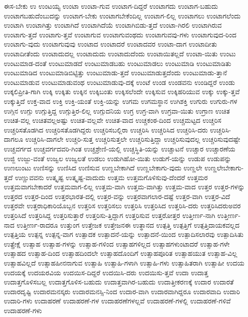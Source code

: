 {ಈಸ-ಬೇಕು
ಉ
ಉಂಟಯ್ಯ
ಉಂಟಾ
ಉಂಟಾ-ಗುವ
ಉಂಟಾಗ-ದಿದ್ದರೆ
ಉಂಟಾಗದು
ಉಂಟಾಗ-ಬಹುದು
ಉಂಟಾಗಬಹುದೆಂಬುದನ್ನು
ಉಂಟಾಗ-ಬೇಕು
ಉಂಟಾಗಬೇಕೆಂದಿಲ್ಲ
ಉಂಟಾಗ-ಲಿಲ್ಲ
ಉಂಟಾಗಲು
ಉಂಟಾಗಲೆಂದು
ಉಂಟಾಗಿ
ಉಂಟಾಗಿತ್ತು
ಉಂಟಾಗಿದೆ
ಉಂಟಾಗಿದೆಯೆ
ಉಂಟಾಗಿಬಿಡು-ತ್ತದೆ
ಉಂಟಾ-ಗಿರಲಿ
ಉಂಟಾಗಿರುವ
ಉಂಟಾಗು-ತ್ತದೆ
ಉಂಟಾಗು-ತ್ತವೆ
ಉಂಟಾಗುವ
ಉಂಟಾಗುವಂಥದು
ಉಂಟಾಗುವವು-ಗಳು
ಉಂಟಾಗುವುದ-ರಿಂದ
ಉಂಟಾಗು-ವುದು
ಉಂಟಾಗುವುವು
ಉಂಟಾದ
ಉಂಟಾದರೆ
ಉಂಟಾದವರ
ಉಂಟಾ-ದಾಗ
ಉಂಟಾದೀತು
ಉಂಟಾದೀತೆಂದು
ಉಂಟಾದುದಲ್ಲ
ಉಂಟಾದುದು
ಉಂಟಾದುದೆಂದು
ಉಂಟಾಯಿತಲ್ಲದೆ
ಉಂಟಾ-ಯಿತು
ಉಂಟು
ಉಂಟುಮಾಡ-ದಂತೆ
ಉಂಟುಮಾಡದೆ
ಉಂಟುಮಾಡಬಹು
ಉಂಟುಮಾಡಲು
ಉಂಟುಮಾಡಿ
ಉಂಟುಮಾಡಿತು
ಉಂಟುಮಾಡಿದ
ಉಂಟುಮಾಡಿಬಿಟ್ಟಿತ್ತು
ಉಂಟುಮಾಡು-ತ್ತದೆ
ಉಂಟುಮಾಡುತ್ತದೆಂದು
ಉಂಟುಮಾಡು-ತ್ತಾನೆ
ಉಂಟುಮಾಡುವ
ಉಂಟುಮಾಡುವಂಥ
ಉಂಟುಮಾಡುವು-ದಕ್ಕೆ
ಉಂಟೆ
ಉಂಡ
ಉಂಡವನು
ಉಂಡಿದ್ದರೆ
ಉಂಡು
ಉಕ್ಕಲಿಪ್ರೀತಿ-ಗಾಗಿ
ಉಕ್ಕಿ
ಉಕ್ಕಿತು
ಉಕ್ಕಿನ
ಉಕ್ಕಿಬಂತು
ಉಕ್ಕಿಸಲೆಂದೇ
ಉಕ್ಕಿಸುವ
ಉಕ್ಕಿಹರಿಯುವ
ಉಕ್ಕು
ಉಕ್ಕು-ತ್ತವೆ
ಉಕ್ಕುತ್ತಿದೆ
ಉಕ್ತ-ವಾದ
ಉಕ್ತಿ
ಉಕ್ತಿ-ಯಂತೆ
ಉಕ್ತಿ-ಯನ್ನು
ಉಗಮ
ಉಗಮಸ್ಥಾನ
ಉಗಿಶಕ್ತಿ
ಉಗುರು
ಉಗುರು-ಗಳ
ಉಗ್ಗಿನ
ಉಗ್ಗು
ಉಗ್ಗುತ್ತಿದ್ದ
ಉಗ್ಗುತ್ತಿರ-ಲಿಲ್ಲ
ಉಗ್ಗುದನಿಯ
ಉಗ್ರ
ಉಗ್ರ-ವಾಗಿ
ಉಗ್ರವಾ-ಯಿತು
ಉಗ್ರಾಣ
ಉಚಿತ
ಉಚಿತ-ವಲ್ಲ
ಉಚಿತವಲ್ಲಅಷ್ಟು
ಉಚಿತ-ವಲ್ಲವೇ
ಉಚಿತ-ವಾದ
ಉಚ್ಚಕಂಠ-ದಿಂದ
ಉಚ್ಚಮಟ್ಟದ
ಉಚ್ಚರಿಸ
ಉಚ್ಚರಿಸತೊಡಗಿದ
ಉಚ್ಚರಿಸತೊಡಗಿದ್ದರು
ಉಚ್ಚರಿಸಬಲ್ಲಿರಾ
ಉಚ್ಚರಿಸಿ
ಉಚ್ಚರಿಸಿದ
ಉಚ್ಚರಿಸಿ-ದರು
ಉಚ್ಚರಿಸಿ-ದಾಗಲೂ
ಉಚ್ಚರಿಸಿ-ದಾಗಲೇ
ಉಚ್ಚರಿ-ಸುತ್ತ
ಉಚ್ಚರಿಸುತ್ತಲೇ
ಉಚ್ಚರಿಸುತ್ತಿದ್ದಾ
ಉಚ್ಚರಿಸುವುದಲ್ಲ
ಉಚ್ಚರಿಸುವುದಷ್ಟೇ
ಉಚ್ಚವರ್ಗದ
ಉಚ್ಚವರ್ಗದವರಿ-ಗಿಂತ
ಉಚ್ಚಶ್ರೇಣಿ-ಯಲ್ಲಿ
ಉಚ್ಚಸ್ಥಿತಿ-ಯನ್ನು
ಉಚ್ಚಾಟನೆ
ಉಚ್ಚಾರ
ಉಚ್ಚಾರಣೆಯ
ಉಜ್ಜಿ
ಉಜ್ಜು-ವಂತೆ
ಉಜ್ವಲ
ಉಜ್ವಲತೆ
ಉಡಲು
ಉಡುಗಿಹೋ-ಯಿತು
ಉಡುಗೆ-ಯನ್ನು
ಉಡುಪ
ಉಡುಪನ್ನು
ಉಣಲುಂಟು
ಉಣಿಸನ್ನು
ಉಣಿಸಿದ
ಉಣಿಸುವ
ಉಣ್ಣಬೇಕಾಗಿದೆ
ಉಣ್ಣಬೇಕಾಗು-ವುದು
ಉಣ್ಣಲೇ
ಉಣ್ಣಲೇಬೇಕಾಗು-ತ್ತದೆ
ಉಣ್ಣುವವನು
ಉತ್ಕೃಷ್ಟ
ಉತ್ಕೃಷ್ಟ-ವಾದುದು
ಉತ್ತಮ
ಉತ್ತಮಗೊಳಿಸುವು-ದೆಂದರೆ
ಉತ್ತಮರ
ಉತ್ತಮವಾಗಬೇಕಾದರೆ
ಉತ್ತಮವಾಗ-ಲಿಲ್ಲ
ಉತ್ತಮ-ವಾಗಿ
ಉತ್ತಮ-ವಾಗಿತ್ತು
ಉತ್ತಮ-ವಾದ
ಉತ್ತರ
ಉತ್ತರ-ಗಳನ್ನು
ಉತ್ತರದ
ಉತ್ತರ-ದಿಂದ
ಉತ್ತರಭಾರತ-ದಲ್ಲಿ
ಉತ್ತರ-ವನ್ನು
ಉತ್ತರವಾಗಲಾರ-ದಷ್ಟೆ
ಉತ್ತರ-ವಾಗಿ
ಉತ್ತರ-ವಿದೆ
ಉತ್ತರವೇ
ಉತ್ತರಾಧಿಕಾರಿಯೊಬ್ಬನ
ಉತ್ತರಿಸ
ಉತ್ತರಿಸಲು
ಉತ್ತರಿಸಿ
ಉತ್ತರಿಸಿದ
ಉತ್ತರಿಸಿ-ದರು
ಉತ್ತರಿಸಿದರುಅವರ
ಉತ್ತರಿಸಿದೆ
ಉತ್ತರಿಸಿದ್ದ
ಉತ್ತರಿಸುತ್ತಾರೆ
ಉತ್ತರಿಸು-ತ್ತಿದ್ದಾಗ
ಉತ್ತರಿಸುವ
ಉತ್ತರೋತ್ತರ
ಉತ್ತೀರ್ಣ-ನಾಗಿ
ಉತ್ತೀರ್ಣ-ನಾದ
ಉತ್ತೀರ್ಣ-ರಾದರೂ
ಉತ್ತುಂಗ
ಉತ್ತೇಜಕ
ಉತ್ತೇಜನಈ
ಉತ್ಥಾನದ
ಉತ್ಪತ್ತಿ
ಉತ್ಪತ್ತಿಗೆ
ಉತ್ಪತ್ತಿದಾಯಕವಲ್ಲದ
ಉತ್ಪತ್ತಿಯ
ಉತ್ಪನ್ನ
ಉತ್ಪನ್ನ-ವಾಗ
ಉತ್ಪಾದಕ
ಉತ್ಪಾದನೆ-ಯನ್ನು
ಉತ್ಪಾದನೆ-ಯಿಂದ
ಉತ್ಪಾದಿಸಲಾರವು
ಉತ್ಪಾದಿಸಿತು
ಉತ್ಪ್ರೇಕ್ಷೆ
ಉತ್ಸಾಹ
ಉತ್ಸಾಹ-ಗಳನ್ನು
ಉತ್ಸಾಹ-ಗಳಿಂದ
ಉತ್ಸಾಹಗಳಿಲ್ಲದ
ಉತ್ಸಾಹಗಳುಂಟಾದರೆ
ಉತ್ಸಾಹ-ಗಳೇ
ಉತ್ಸಾಹದ
ಉತ್ಸಾಹ-ದಿಂದ
ಉತ್ಸಾಹದಿಂದಲೇ
ಉತ್ಸಾಹದೊಂದಿಗೆ
ಉತ್ಸಾಹಪೂರಿತ
ಉತ್ಸಾಹಯುತ
ಉತ್ಸಾಹ-ವಿಲ್ಲ
ಉತ್ಸಾಹವಿಲ್ಲದೆ
ಉತ್ಸಾಹಹೀನನಾಗುವ
ಉತ್ಸಾಹಿ
ಉತ್ಸಾಹಿ-ಗಳಾಗಿ
ಉತ್ಸಾಹಿ-ಗಳು
ಉತ್ಸಾಹಿತರಾಗಿ
ಉತ್ಸಾಹೀ
ಉದಯ
ಉದಯಕ್ಕೆ
ಉದಯರವಿಯ
ಉದಯಿಸ-ದಿದ್ದರೆ
ಉದಯಿಸಿ-ದರು
ಉದಯಿಸು-ತ್ತವೆ
ಉದಾ
ಉದಾತ್ತ
ಉದಾತ್ತಗೊಳಿಸಬಲ್ಲ
ಉದಾತ್ತಗೊಳಿಸ-ಬಹುದು
ಉದಾತ್ತವಾಗಿರ-ಬಹುದು
ಉದಾತ್ತೀಕರಣಕ್ಕೆ
ಉದಾರ
ಉದಾರತೆ
ಉದಾರದೃಷ್ಟಿ
ಉದಾರಮನಸ್ಕರು
ಉದಾರಮನಸ್ಸಿ-ನಿಂದ
ಉದಾರ-ವಾಗಿ
ಉದಾರವಾಗಿದ್ದರೂ
ಉದಾರವಾದಿ
ಉದಾರಿ
ಉದಾರಿ-ಗಳು
ಉದಾಹರಣೆ
ಉದಾಹರಣೆ-ಗಳ
ಉದಾಹರಣೆಗಳಲ್ಲವೆ
ಉದಾಹರಣೆ-ಗಳಲ್ಲಿ
ಉದಾಹರಣೆ-ಗಳಿವೆ
ಉದಾಹರಣೆ-ಗಳು
}
